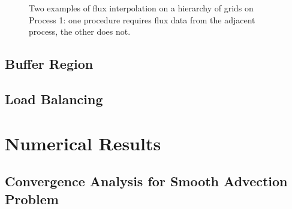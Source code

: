 \documentclass[12pt,letterpaper]{article}
\begin{document}

    \begin{figure}[H]
        \center
        
       \caption{Two examples of flux interpolation on a hierarchy of grids
        on Process 1: one procedure requires flux data from the adjacent
        process, the other does not.}
    \end{figure}

    \subsection*{Buffer Region}

    \subsection*{Load Balancing}

\section{Numerical Results}

    \subsection*{Convergence Analysis for Smooth Advection Problem}
\end{document}
